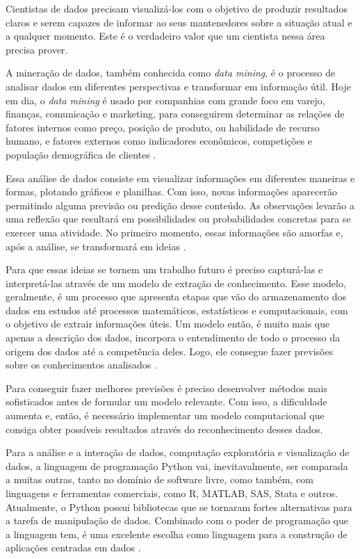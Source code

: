 Cientistas de dados precisam visualizá-los com o objetivo de produzir resultados claros e serem capazes de informar ao seus mantenedores sobre a situação atual e a qualquer momento. Este é o verdadeiro valor que um cientista nessa área precisa prover.

A mineração de dados, também conhecida como \textit{data mining}, é o processo de analisar dados em diferentes perspectivas e transformar em informação útil. Hoje em dia, o \textit{data mining} é usado por companhias com grande foco em varejo, finanças, comunicação e marketing, para conseguirem determinar as relações de fatores internos como preço, posição de produto, ou habilidade de recurso humano, e fatores externos como indicadores econômicos, competições e população demográfica de clientes \cite{mining-social-web}.

Essa análise de dados consiste em visualizar informações em diferentes maneiras e formas, plotando gráficos e planilhas. Com isso, novas informações aparecerão permitindo alguma previsão ou predição desse conteúdo. As observações levarão a uma reflexão que resultará em possibilidades ou probabilidades concretas para se exercer uma atividade. No primeiro momento, essas informações são amorfas e, após a análise, se transformará em ideias \cite{han}.

Para que essas ideias se tornem um trabalho futuro é preciso capturá-las e interpretá-las através de um modelo de extração de conhecimento. Esse modelo, geralmente, é um processo que apresenta etapas que vão do armazenamento dos dados em estudos até processos matemáticos, estatísticos e computacionais, com o objetivo de extrair informações úteis. Um modelo então, é muito mais que apenas a descrição dos dados, incorpora o entendimento de todo o processo da origem dos dados até a competência deles. Logo, ele consegue fazer previsões sobre os conhecimentos analisados \cite{han}.

Para conseguir fazer melhores previsões é preciso desenvolver métodos mais sofisticados antes de formular um modelo relevante. Com isso, a dificuldade aumenta e, então, é necessário implementar um modelo computacional que consiga obter possíveis resultados através do reconhecimento desses dados.

Para a análise e a interação de dados, computação exploratória e visualização de dados, a linguagem de programação Python vai, inevitavalmente, ser comparada a muitas outras, tanto no domínio de software livre, como também, com linguagens e ferramentas comerciais, como R, MATLAB, SAS, Stata e outros. Atualmente, o Python possui bibliotecas que se tornaram fortes alternativas para a tarefa de manipulação de dados. Combinado com o poder de programação que a linguagem tem, é uma excelente escolha como linguagem para a construção de aplicações centradas em dados \cite{python-analysis}.

